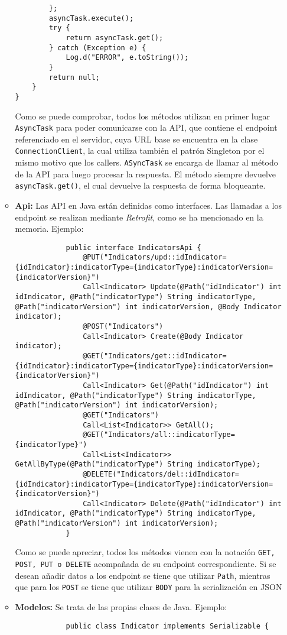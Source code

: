 \begin{itemize}
\begin{itemize}
\begin{lstlisting}
        };
        asyncTask.execute();
        try {
            return asyncTask.get();
        } catch (Exception e) {
            Log.d("ERROR", e.toString());
        }
        return null;
    }
}
        \end{lstlisting}
        Como se puede comprobar, todos los métodos utilizan en primer lugar
        \texttt{AsyncTask} para poder comunicarse con la API, que contiene el
        endpoint referenciado en el servidor, cuya URL base se encuentra en la
        clase \texttt{ConnectionClient}, la cual utiliza también el patrón
        Singleton por el mismo motivo que los callers. \texttt{ASyncTask} se
        encarga de llamar al método de la API para luego procesar la respuesta.
        El método siempre devuelve \texttt{asyncTask.get()}, el cual devuelve la
        respuesta de forma bloqueante.
        \item \textbf{Api: }Las API en Java están definidas como interfaces. Las llamadas a los endpoint se realizan mediante \textit{Retrofit}, como se ha mencionado en la memoria. Ejemplo:
        \begin{lstlisting}
            public interface IndicatorsApi {
                @PUT("Indicators/upd::idIndicator={idIndicator}:indicatorType={indicatorType}:indicatorVersion={indicatorVersion}")
                Call<Indicator> Update(@Path("idIndicator") int idIndicator, @Path("indicatorType") String indicatorType, @Path("indicatorVersion") int indicatorVersion, @Body Indicator indicator);
                @POST("Indicators")
                Call<Indicator> Create(@Body Indicator indicator);
                @GET("Indicators/get::idIndicator={idIndicator}:indicatorType={indicatorType}:indicatorVersion={indicatorVersion}")
                Call<Indicator> Get(@Path("idIndicator") int idIndicator, @Path("indicatorType") String indicatorType, @Path("indicatorVersion") int indicatorVersion);
                @GET("Indicators")
                Call<List<Indicator>> GetAll();
                @GET("Indicators/all::indicatorType={indicatorType}")
                Call<List<Indicator>> GetAllByType(@Path("indicatorType") String indicatorType);
                @DELETE("Indicators/del::idIndicator={idIndicator}:indicatorType={indicatorType}:indicatorVersion={indicatorVersion}")
                Call<Indicator> Delete(@Path("idIndicator") int idIndicator, @Path("indicatorType") String indicatorType, @Path("indicatorVersion") int indicatorVersion);
            }
        \end{lstlisting}
        Como se puede apreciar, todos los métodos vienen con la notación \texttt{GET, POST, PUT o DELETE} acompañada de su endpoint correspondiente. Si se desean añadir datos a los endpoint se tiene que utilizar \texttt{Path}, mientras que para los \texttt{POST} se tiene que utilizar \texttt{BODY} para la serialización en JSON
        \item \textbf{Modelos: }Se trata de las propias clases de Java. Ejemplo:
        \begin{lstlisting}
            public class Indicator implements Serializable {


\end{lstlisting}
\end{itemize}
\end{itemize}
